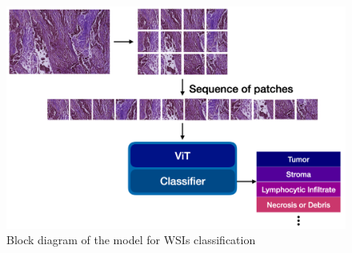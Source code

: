 \documentclass[rebuttal]{cvpr}
\begin{document}
    \begin{figure}[ht]
    \begin{center}
       \includegraphics[width=0.8\linewidth]{media/classifier.png}
    \end{center}
       \caption{Block diagram of the model for WSIs classification}
    \label{fig:class}
    \end{figure}
    
\end{document}

